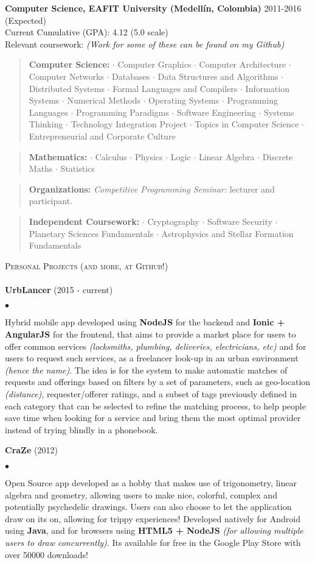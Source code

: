 \documentclass{article}
\newcommand{\area}[2]{\vspace*{-5pt} \begin{verse}\textbf{#1} #2 \end{verse}
}
\newcommand{\lineunder}{\vspace*{-8pt} \\ \hspace*{-18pt} \hrulefill \\}
\newcommand{\header}[1]{{\hspace*{-15pt}\vspace*{6pt}
    \textsc{#1}} \vspace*{-6pt} \lineunder}
\newenvironment{achievements}{\begin{list}{$\bullet$}{\topsep 2pt \itemsep
      -2pt}}{\vspace*{5pt}\end{list}}
\newcommand{\schoolwithcourses}[4]{
  \textbf{#1} #2 \\ #3 \\ #4
  \vspace*{5pt} }
\begin{document}
\schoolwithcourses{Computer Science, EAFIT University (Medell\'in, Colombia)}{2011-2016 (Expected)}
{Current Cumulative (GPA): 4.12 (5.0 scale)}
{Relevant coursework: \textit{(Work for some of these can be found on my Github)}}
\area{Computer Science:}{
 $\cdot$ Computer Graphics $\cdot$ Computer Architecture $\cdot$ Computer Networks $\cdot$ Databases
 $\cdot$ Data Structures and Algorithms $\cdot$ Distributed Systems $\cdot$ Formal Languages and Compilers $\cdot$ Information Systems $\cdot$ Numerical Methods $\cdot$ Operating Systems $\cdot$ Programming Languages $\cdot$ Programming Paradigms $\cdot$ 
  Software Engineering $\cdot$ Systems Thinking $\cdot$ Technology Integration Project $\cdot$ Topics in Computer Science $\cdot$ Entrepreneurial and Corporate Culture
  }
\area{Mathematics:}{$\cdot$ Calculus $\cdot$ Physics $\cdot$ Logic $\cdot$ Linear Algebra $\cdot$ Discrete
  Maths $\cdot$ Statistics}
\area{Organizations:} {
  \textit{Competitive Programming Seminar:} lecturer and participant.
}
\area{Independent Coursework:}{
  $\cdot$ Cryptography $\cdot$ Software Security $\cdot$ Planetary Sciences Fundamentals $\cdot$ Astrophysics and Stellar Formation Fundamentals
}
\header{Personal Projects (and more, at Github!)}
\textbf{UrbLancer} (2015 - current)
\begin{achievements}
\item Hybrid mobile app developed using \textbf{NodeJS} for the backend and \textbf{Ionic + AngularJS} for the frontend, that aims to provide a market place for users to offer common services \textit{(locksmiths, plumbing, deliveries, electricians, etc)} and for users to request such services, as a freelancer look-up in an urban environment \textit{(hence the name)}. The idea is for the system to make automatic matches of requests and offerings based on filters by a set of parameters, such as geo-location \textit{(distance)}, requester/offerer ratings, and a subset of tags previously defined in each category that can be selected to refine the matching process, to help people save time when looking for a service and bring them the most optimal provider instead of trying blindly in a phonebook.
\end{achievements}
\textbf{CraZe} (2012)
\begin{achievements}
\item Open Source app developed as a hobby that makes use of trigonometry, linear algebra and geometry, allowing users to make nice, colorful, complex and potentially psychedelic drawings. Users can also choose to let the application draw on its on, allowing for trippy experiences! Developed natively for Android using \textbf{Java}, and for browsers using \textbf{HTML5 + NodeJS} \textit{(for allowing multiple users to draw concurrently)}. Its available for free in the Google Play Store with over 50000 downloads!
\end{achievements}
\end{document}

